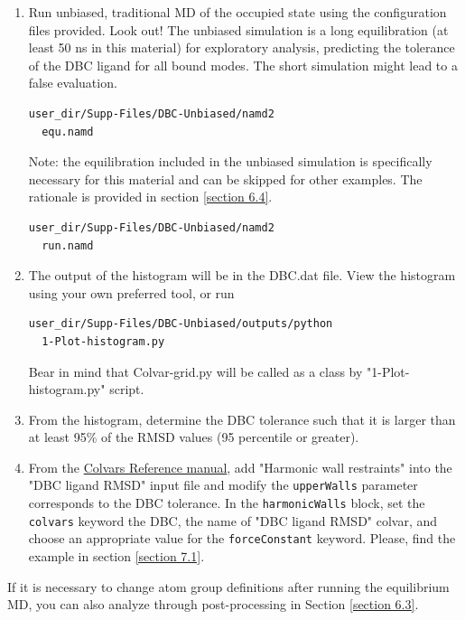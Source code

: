 \documentclass[9pt,tutorial]{livecoms}
\newcommand{\jh}[1]{\textcolor{blue}{JH: #1}}
\newcommand{\Mina}[1]{\textcolor{magenta}{Mina: #1}}
\begin{document}
\begin{enumerate}[left=0pt .. \parindent]
\begin{enumerate}
\item Run unbiased, traditional MD of the occupied state using the configuration files provided. Look out! The unbiased simulation is a long equilibration (at least 50 ns in this material) for exploratory analysis, predicting the tolerance of the DBC ligand for all bound modes. The short simulation might lead to a false evaluation.
\begin{verbatim}
user_dir/Supp-Files/DBC-Unbiased/namd2
  equ.namd
\end{verbatim}
Note: the equilibration included in the unbiased simulation is specifically necessary for this material and can be skipped for other examples. The rationale is provided in section \ref{section 6.4}.
\begin{verbatim}
user_dir/Supp-Files/DBC-Unbiased/namd2
  run.namd
\end{verbatim}
\item The output of the histogram will be in the DBC.dat file. View the histogram using your own preferred tool, or run 
\begin{verbatim}
user_dir/Supp-Files/DBC-Unbiased/outputs/python
  1-Plot-histogram.py
\end{verbatim}
Bear in mind that Colvar-grid.py will be called as a class by "1-Plot-histogram.py" script.
\item From the histogram, determine the DBC tolerance such that it is larger than at least 95\% of the RMSD values (95 percentile or greater).  
\item From the \href{https://colvars.github.io/colvars-refman-namd/colvars-refman-namd.html}{Colvars Reference manual}, add "Harmonic wall restraints" into the "DBC ligand RMSD" input file and modify the \texttt{upperWalls} parameter corresponds to the DBC tolerance. In the \texttt{harmonicWalls} block, set the \texttt{colvars} keyword the DBC, the name of "DBC ligand RMSD" colvar, and choose an appropriate value for the \texttt{forceConstant} keyword. Please, find the example in section \ref{section 7.1}. %
\end{enumerate}
If it is necessary to change atom group definitions after running the equilibrium MD, you can also analyze through post-processing in Section \ref{section 6.3}. 
    

\end{enumerate}
\end{document}
